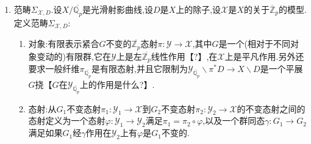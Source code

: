 \begin{enumerate}
\begin{enumerate}[(1)]
\begin{proof}
        	取$\mathcal{S}_{\mathcal{X},D}^{\mathrm{ss}}$中的对象$\pi:\mathcal{Y}\to\mathcal{X}$,按照逆向系统和概形性质的兼容性,存在有限扩张$K/\mathbb{Q}_p$使得$\pi$下降为$\mathcal{S}_{\mathcal{X}_{\mathscr{O}_K},D_K}$中的对象$\pi_{\mathscr{O}_K}:\mathcal{Y}_{\mathscr{O}_K}\to\mathcal{X}_{\mathscr{O}_K}$使得结构态射$\mathcal{Y}_{\mathscr{O}_K}\to\mathrm{Spec}\mathscr{O}_K$是平坦态射.按照$\mathcal{Y}_{\mathscr{O}_K}/\mathscr{O}_K$和$\mathcal{Y}/\overline{\mathbb{Z}_p}$的几何纤维是一致的【?】,从后者在$\mathcal{S}_{\mathcal{X},D}^{\mathrm{ss}}$中就得到前者在$\mathcal{S}_{\mathcal{X}_{\mathscr{O}_K},D_K}^{\mathrm{ss}}$中,进而它落在$\mathcal{S}_{\mathcal{X}_{\mathscr{O}_K},D_K}^{\mathrm{good}}$.再按照基变换保这个完全子范畴,就得到$\pi=\pi_{\mathscr{O}_K}\otimes_{\mathscr{O}_K}\overline{\mathbb{Z}_p}$落在$\mathcal{S}_{\mathcal{X},D}^{\mathrm{good}}$中.
        \end{proof}
    	\item 对$\mathcal{S}_{\mathcal{X},D}$的任意对象$\pi:\mathcal{Y}\to\mathcal{X}$,存在$\mathcal{S}_{\mathcal{X},D}^{\mathrm{ss}}$中的对象严格控制了$\pi$.
    	\item 对$\mathcal{S}_{\mathcal{X},D}$的有限个对象$\pi_i:\mathcal{Y}_i\to\mathcal{X}$,存在$\mathcal{S}_{\mathcal{X},D}^{\mathrm{ss}}$中的对象控制了全部$\pi_i$.
    \end{enumerate}
    \item 范畴$\Sigma_{\mathcal{X},D}$.设$X/\overline{\mathbb{Q}_p}$是光滑射影曲线,设$D$是$X$上的除子,设$\mathcal{X}$是$X$的关于$\overline{\mathbb{Z}}_p$的模型.定义范畴$\Sigma_{\mathcal{X},D}$:
    \begin{enumerate}
    	\item 对象:有限表示紧合$G$不变的$\overline{\mathbb{Z}_p}$态射$\pi:\mathcal{Y}\to\mathcal{X}$,其中$G$是一个(相对于不同对象变动的)有限群,它在$\mathcal{Y}$上是左$\overline{\mathbb{Z}_p}$线性作用【?】,在$\mathcal{X}$上是平凡作用.另外还要求一般纤维$\pi_{\overline{\mathbb{Q}_p}}$是有限态射,并且它限制为$\mathcal{Y}_{\overline{\mathbb{Q}_p}}\backslash\pi^*D\to X\backslash D$是一个平展$G$挠【$G$在$\mathcal{Y}_{\overline{\mathbb{Q}_p}}$上的作用是什么?】.
    	\item 态射:从$G_1$不变态射$\pi_1:\mathcal{Y}_1\to\mathcal{X}$到$G_2$不变态射$\pi_2:\mathcal{Y}_2\to\mathcal{X}$的不变态射之间的态射定义为一个态射$\varphi:\mathcal{Y}_1\to\mathcal{Y}_2$满足$\pi_1=\pi_2\circ\varphi$,以及一个群同态$\gamma:G_1\to G_2$满足如果$G_1$经$\gamma$作用在$\mathcal{Y}_2$上有$\varphi$是$G_1$不变的.
    \end{enumerate}
    

\end{enumerate}
